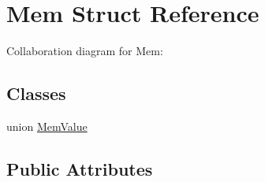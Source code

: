 \hypertarget{structMem}{}\section{Mem Struct Reference}
\label{structMem}


Collaboration diagram for Mem\+:
\subsection*{Classes}
\begin{DoxyCompactItemize}
\item 
union \hyperlink{unionMem_1_1MemValue}{Mem\+Value}
\end{DoxyCompactItemize}
\subsection*{Public Attributes}
